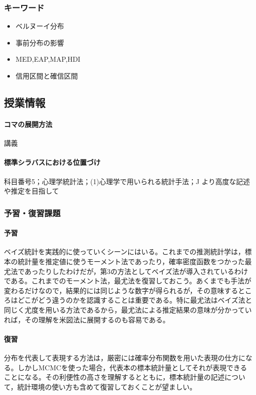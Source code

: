 \subsubsection{キーワード}
\begin{itemize}
\item ベルヌーイ分布
\item 事前分布の影響
\item MED,EAP,MAP,HDI
\item 信用区間と確信区間
\end{itemize}
\subsection{授業情報}
\paragraph{コマの展開方法}
講義
\paragraph{標準シラバスにおける位置づけ}
科目番号5；心理学統計法；(1)心理学で用いられる統計手法；J より高度な記述や推定を目指して
\subsubsection{予習・復習課題}
\paragraph{予習}
ベイズ統計を実践的に使っていくシーンにはいる。これまでの推測統計学は，標本の統計量を推定値に使うモーメント法であったり，確率密度函数をつかった最尤法であったりしたわけだが，第3の方法としてベイズ法が導入されているわけである。これまでのモーメント法，最尤法を復習しておこう。あくまでも手法が変わるだけなので，結果的には同じような数字が得られるが，その意味するところはどこがどう違うのかを認識することは重要である。特に最尤法はベイズ法と同じく尤度を用いる方法であるから，最尤法による推定結果の意味が分かっていれば，その理解を米図法に展開するのも容易である。
\paragraph{復習}
分布を代表して表現する方法は，厳密には確率分布関数を用いた表現の仕方になる。しかしMCMCを使った場合，代表本の標本統計量としてそれが表現できることになる。その利便性の高さを理解するとともに，標本統計量の記述について，統計環境の使い方も含めて復習しておくことが望ましい。